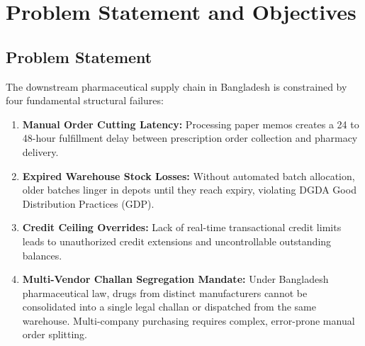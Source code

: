 \documentclass[10pt,a4paper]{article}
\begin{document}
\section{Problem Statement and Objectives}
\subsection{Problem Statement}
The downstream pharmaceutical supply chain in Bangladesh is constrained by four fundamental structural failures:
\begin{enumerate}[leftmargin=*]
    \item \textbf{Manual Order Cutting Latency:} Processing paper memos creates a 24 to 48-hour fulfillment delay between prescription order collection and pharmacy delivery.
    \item \textbf{Expired Warehouse Stock Losses:} Without automated batch allocation, older batches linger in depots until they reach expiry, violating DGDA Good Distribution Practices (GDP).
    \item \textbf{Credit Ceiling Overrides:} Lack of real-time transactional credit limits leads to unauthorized credit extensions and uncontrollable outstanding balances.
    \item \textbf{Multi-Vendor Challan Segregation Mandate:} Under Bangladesh pharmaceutical law, drugs from distinct manufacturers cannot be consolidated into a single legal challan or dispatched from the same warehouse. Multi-company purchasing requires complex, error-prone manual order splitting.
\end{enumerate}
\end{document}
